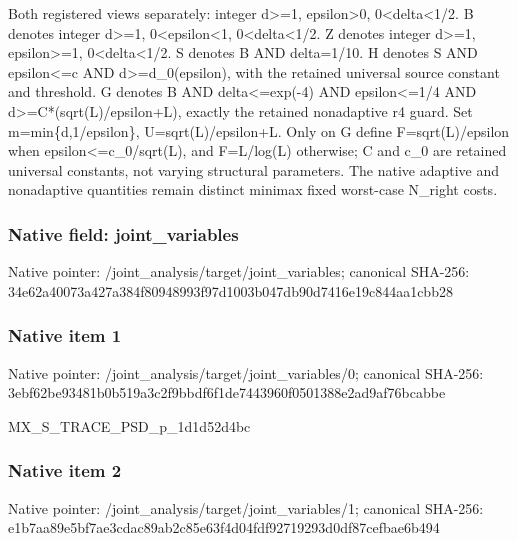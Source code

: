 \documentclass[10pt,a4paper]{article}
\begin{document}
\begingroup\raggedright\sloppy Both registered views separately:\allowbreak{} integer d>=\allowbreak{}1,\allowbreak{} epsilon>0,\allowbreak{} 0<delta<1/\allowbreak{}2. B denotes integer d>=\allowbreak{}1,\allowbreak{} 0<epsilon<1,\allowbreak{} 0<delta<1/\allowbreak{}2. Z denotes integer d>=\allowbreak{}1,\allowbreak{} epsilon>=\allowbreak{}1,\allowbreak{} 0<delta<1/\allowbreak{}2. S denotes B AND delta=\allowbreak{}1/\allowbreak{}10. H denotes S AND epsilon<=\allowbreak{}c AND d>=\allowbreak{}d\_\allowbreak{}0(epsilon),\allowbreak{} with the retained universal source constant and threshold. G denotes B AND delta<=\allowbreak{}exp(-4) AND epsilon<=\allowbreak{}1/\allowbreak{}4 AND d>=\allowbreak{}C*(sqrt(L)/\allowbreak{}epsilon+L),\allowbreak{} exactly the retained nonadaptive r4 guard. Set m=\allowbreak{}min\{d,\allowbreak{}1/\allowbreak{}epsilon\},\allowbreak{} U=\allowbreak{}sqrt(L)/\allowbreak{}epsilon+L. Only on G define F=\allowbreak{}sqrt(L)/\allowbreak{}epsilon when epsilon<=\allowbreak{}c\_\allowbreak{}0/\allowbreak{}sqrt(L),\allowbreak{} and F=\allowbreak{}L/\allowbreak{}log(L) otherwise;\allowbreak{} C and c\_\allowbreak{}0 are retained universal constants,\allowbreak{} not varying structural parameters. The native adaptive and nonadaptive quantities remain distinct minimax fixed worst-case N\_\allowbreak{}right costs.\par\endgroup

\subsubsection{Native field: joint\_\allowbreak{}variables}
Native pointer: /joint\_\allowbreak{}analysis/target/joint\_\allowbreak{}variables; canonical SHA-256: 34e62a40073a427a384f80948993f97d1003b047db90d7416e19c844aa1cbb28

\subsubsection{Native item 1}
Native pointer: /joint\_\allowbreak{}analysis/target/joint\_\allowbreak{}variables/0; canonical SHA-256: 3ebf62be93481b0b519a3c2f9bbdf6f1de7443960f0501388e2ad9af76bcabbe

\begingroup\raggedright\sloppy MX\_\allowbreak{}S\_\allowbreak{}TRACE\_\allowbreak{}PSD\_\allowbreak{}p\_\allowbreak{}1d1d52d4bc\par\endgroup

\subsubsection{Native item 2}
Native pointer: /joint\_\allowbreak{}analysis/target/joint\_\allowbreak{}variables/1; canonical SHA-256: e1b7aa89e5bf7ae3cdac89ab2c85e63f4d04fdf92719293d0df87cefbae6b494
\end{document}
